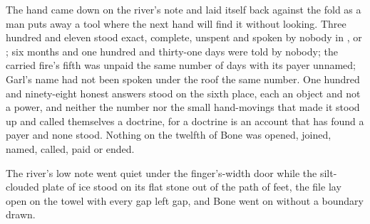 The hand came down on the river's note and laid itself back against the fold as a man puts away a tool where the next hand will find it without looking. Three hundred and eleven stood exact, complete, unspent and spoken by nobody in ,  or ; six months and one hundred and thirty-one days were told by nobody; the carried fire's fifth was unpaid the same number of days with its payer unnamed; Garl's name had not been spoken under the roof the same number. One hundred and ninety-eight honest answers stood on the sixth place, each an object and not a power, and neither the number nor the small hand-movings that made it stood up and called themselves a doctrine, for a doctrine is an account that has found a payer and none stood. Nothing on the twelfth of Bone was opened, joined, named, called, paid or ended.

The river's low note went quiet under the finger's-width door while the silt-clouded plate of ice stood on its flat stone out of the path of feet, the file lay open on the towel with every gap left gap, and Bone went on without a boundary drawn.
